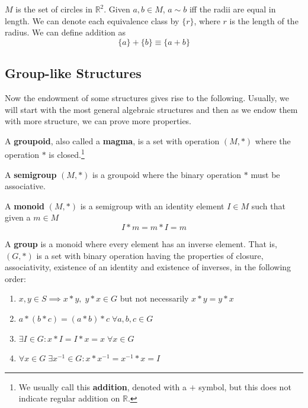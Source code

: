 \documentclass{article}
\begin{document}
    \begin{example}[Circles]
      $M$ is the set of circles in $\mathbb{R}^{2}$. Given $a, b \in M$, $a \sim b$ iff the radii are equal in length. We can denote each equivalence class by $\{ r \}$, where $r$ is the length of the radius. We can define addition as 
      \begin{equation}
        \{ a \} + \{ b \} \equiv \{ a + b\}
      \end{equation}
    \end{example}

  \subsection{Group-like Structures}

    Now the endowment of some structures gives rise to the following. Usually, we will start with the most general algebraic structures and then as we endow them with more structure, we can prove more properties. 

    \begin{definition}[Groupoid]
      A \textbf{groupoid}, also called a \textbf{magma}, is a set with operation $(M, *)$ where the operation $*$ is closed.\footnote{We usually call this \textbf{addition}, denoted with a $+$ symbol, but this does not indicate regular addition on $\mathbb{R}$. }
    \end{definition}

    \begin{definition}[Semigroup]
      A \textbf{semigroup} $(M, *)$ is a groupoid where the binary operation $*$ must be associative.  
    \end{definition}

    \begin{definition}[Monoid]
      A \textbf{monoid} $(M, *)$ is a semigroup with an identity element $I \in M$ such that given a $m \in M$
      \begin{equation}
        I * m = m * I = m
      \end{equation}
    \end{definition}

    \begin{definition}[Group]
      A \textbf{group} is a monoid where every element has an inverse element. That is, $(G, *)$ is a set with binary operation having the properties of closure, associativity, existence of an identity and existence of inverses, in the following order: 
      \begin{enumerate}
        \item $x, y \in S \implies x*y, \;y*x \in G$ but not necessarily $x*y  = y*x$
        \item $a*(b*c) = (a*b)*c \; \forall a, b, c \in G$
        \item $\exists I \in G : x*I = I*x = x \; \forall x \in G $
        \item $\forall x \in G \; \exists x^{-1} \in G : x * x^{-1} = x^{-1} * x = I$
      \end{enumerate}
    \end{definition}
\end{document}
